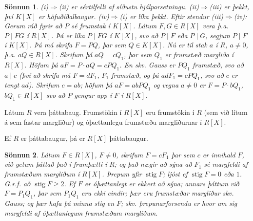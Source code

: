 \documentclass[a4paper,icelandic,11pt]{book}
\theoremstyle{plain}
\newtheorem*{sonnun}{Sönnun}
\DeclareMathOperator{\stig}{stig} %
\begin{document}
\begin{sonnun}
  (i)$\Rightarrow$(ii) er sértilfelli af síðustu hjálparsetningu.
  (ii)$\Rightarrow$(iii) er þekkt, því $K[X]$ er höfuðíðalbaugur.
  (iv)$\Rightarrow$(i) er líka þekkt. Eftir stendur (iii)$\Rightarrow$(iv):
  Gerum ráð fyrir að $P$ sé frumstak í $K[X]$. Látum $F,G\in R[X]$ vera þ.a.
  $P\mid FG$ í $R[X]$. Þá er líka $P\mid FG$ í $K[X]$, svo að $P\mid F$ eða
  $P\mid G$, segjum $P\mid F$ í $K[X]$. Þá má skrifa $F = PQ$, þar sem $Q\in
  K[X]$. Nú er til stak $a$ í $R$, $a\neq 0$, þ.a. $aQ\in R[X]$. Skrifum þá $aQ
  = cQ_1$, þar sem $Q_1$ er frumstæð margliða í $R[X]$. Höfum þá $aF = P\cdot
  aQ= cPQ_1$. En skv. Gauss er $PQ_1$ frumstæð, svo að $a\mid c$ (því að skrifa
  má $F = dF_1$, $F_1$ frumstæð, og þá $adF_1 = cPQ_1$, svo að $c$ er tengt
  $ad$). Skrifum $c = ab$; höfum þá $aF = abPQ_1$ og vegna $a\neq 0$ er $F =
  P\cdot bQ_1$, $bQ_1\in R[X]$ svo að $P$ gengur upp í $F$ í $R[X]$.
\end{sonnun}
\begin{fylgisetn}
  Látum $R$ vera þáttabaug. Frumstökin í $R[X]$ eru frumstökin í $R$ (sem við
  lítum á sem fastar margliður) og óþættanlegu frumstæðu margliðurnar í $R[X]$.
\end{fylgisetn}
\begin{setn}
  Ef $R$ er þáttabaugur, þá er $R[X]$ þáttabaugur.
\end{setn}
\begin{sonnun}
  Látum $F\in R[X]$, $F\neq 0$, skrifum $F = cF_1$ þar sem $c$ er innihald $F$,
  við getum þáttað það í frumþætti í $R$; og það nægir að sýna að $F_1$ sé
  margfeldi af frumstæðum margliðum í $R[X]$. Þrepum yfir $\stig F$; ljóst ef
  $\stig F = 0$ eða $1$. G.r.f. að $\stig F\geq 2$. Ef $F$ er óþættanlegt er
  ekkert að sýna; annars þáttum við $F = P_1Q_1$, þar sem $P_1Q_1$ eru ekki
  eindir; þær eru frumstæðar margliður skv. Gauss; og þær hafa þá minna stig en
  $F$; skv. þrepunarforsendu er hvor um sig margfeldi af óþættanlegum frumstæðum
  margliðum.
\end{sonnun}
\end{document}
